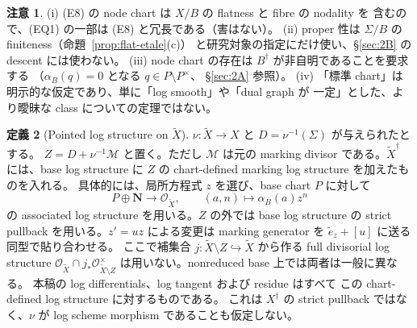 \documentclass[11pt,a4paper]{article}
\numberwithin{equation}{section}
\theoremstyle{definition}
\newtheorem{definition}{定義}[section]
\newtheorem{remark}[definition]{注意}
\newcommand{\tX}{\widetilde X}
\begin{document}
\begin{remark}\label{rem:EQ-redundancy}
(i) (E8) の node chart は \(X/B\) の flatness と fibre の nodality を
含むので、(EQ1) の一部は (E8) と冗長である（害はない）。
(ii) proper 性は \(\Sigma/B\) の finiteness（命題~\ref{prop:flat-etale}(c)）
と研究対象の指定にだけ使い、\S\ref{sec:2B} の descent には使わない。
(iii) node chart の存在は \(B^\dagger\) が非自明であることを要求する
（\(\alpha_B(q)=0\) となる \(q\in P\setminus P^\times\)、
§\ref{sec:2A} 参照）。
(iv) 「標準 chart」は明示的な仮定であり、単に「log smooth」や「dual graph が
一定」とした、より曖昧な class についての定理ではない。
\end{remark}

\begin{definition}[Pointed log structure on \(\tX\)]\label{def:pointed}
\(\nu:\tX\to X\) と \(D=\nu^{-1}(\Sigma)\) が与えられたとする。
\(Z=D+\nu^{-1}\mathcal M\) と置く。ただし \(\mathcal M\) は元の
marking divisor である。\(\tX^\dagger\) には、base log structure に
\(Z\) の chart-defined marking log structure を加えたものを入れる。
具体的には、局所方程式 \(z\) を選び、base chart \(P\) に対して
\[
  P\oplus\mathbf N\longrightarrow\mathcal O_{\tX},
  \qquad (a,n)\longmapsto\alpha_B(a)z^n
\]
の associated log structure を用いる。\(Z\) の外では base log
structure の strict pullback を用いる。\(z'=uz\) による変更は
marking generator を \(\widetilde e_z+[u]\) に送る同型で貼り合わせる。
ここで補集合 \(j:\tX\setminus Z\hookrightarrow\tX\) から作る
full divisorial log structure
\(\mathcal O_{\tX}\cap j_*\mathcal O_{\tX\setminus Z}^{\times}\)
は用いない。nonreduced base 上では両者は一般に異なる。
本稿の log differentials、log tangent および residue はすべて
この chart-defined log structure に対するものである。
これは \(X^\dagger\) の strict pullback ではなく、\(\nu\) が
log scheme morphism であることも仮定しない。
\end{definition}
\end{document}
